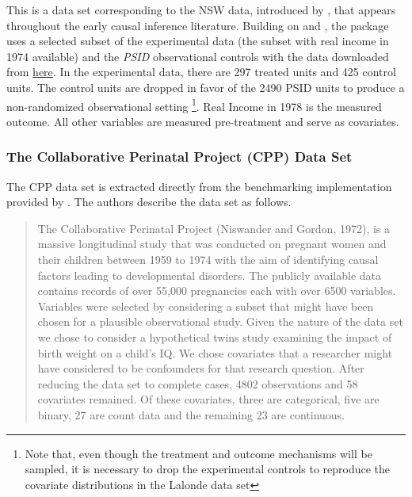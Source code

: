 \documentclass[../main.tex]{subfiles}
\begin{document}
This is a data set corresponding to the NSW data, introduced by \textcite{Lalonde1986EvaluatingData}, that appears throughout the early causal inference literature. Building on \textcite{Dehejia2005PracticalTodd} and \textcite{Smith2005DoesEstimators}, the package uses a selected subset of the \textcite{Lalonde1986EvaluatingData} experimental data (the subset with real income in 1974 available) and the \textit{PSID} observational controls with the data downloaded from \href{https://users.nber.org/~rdehejia/data/.nswdata2.html}{here}. In the experimental data, there are 297 treated units and 425 control units. The control units are dropped in favor of the 2490 PSID units to produce a non-randomized observational setting \footnote{Note that, even though the treatment and outcome mechanisms will be sampled, it is necessary to drop the experimental controls to reproduce the covariate distributions in the Lalonde data set}. Real Income in 1978 is the measured outcome. All other variables are measured pre-treatment and serve as covariates.

\subsubsection{The Collaborative Perinatal Project (CPP) Data Set}

The CPP data set is extracted directly from the benchmarking implementation provided by \textcite{Dorie2019Automated1}. The authors describe the data set as follows.

\begin{quote}
    The Collaborative Perinatal Project (Niswander and Gordon, 1972), is a massive longitudinal study that was conducted on pregnant women and their children between 1959 to 1974 with the aim of identifying causal factors leading to developmental disorders. The publicly available data contains records of over 55,000 pregnancies each with over 6500 variables. Variables were selected by considering a subset that might have been chosen for a plausible observational study. Given the nature of the data set we chose to consider a hypothetical twins study examining the impact of birth weight on a child’s IQ. We chose covariates that a researcher might have considered to be confounders for that research question. After reducing the data set to complete cases, 4802 observations and 58 covariates remained. Of these covariates, three are categorical, five are binary, 27 are count data and the remaining 23 are continuous.
\end{quote}
\end{document}
